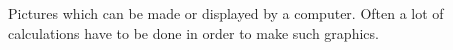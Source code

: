 Pictures which can be made or displayed by a computer. Often a lot of 
calculations have to be done in order to make such graphics.